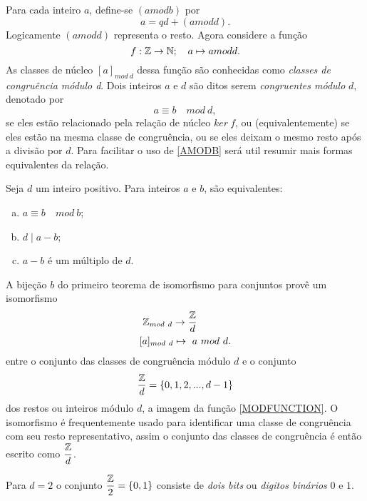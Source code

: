 Para cada inteiro $a$, define-se $(a mod b)$ por
\begin{equation}\label{MOD}
  a = qd + (a mod d).
\end{equation}
Logicamente $(a mod d)$ representa o resto. Agora considere a função
\begin{equation}\label{MODFUNCTION}
  f: \mathbb{Z} \to \mathbb{N};\quad a \mapsto a mod d.
\end{equation}
As classes de núcleo $[a]_{mod\ d}$ dessa função são conhecidas como \emph{classes de congruência módulo d}. Dois inteiros $a$ e $d$ são ditos serem \emph{congruentes módulo} $d$, denotado por
\begin{equation}\label{AMODB}
  a \equiv b\quad mod\ d,
\end{equation}
se eles estão relacionado pela relação de núcleo $ker\ f$, ou (equivalentemente) se eles estão na mesma classe de congruência, ou se eles deixam o mesmo resto após a divisão por $d$. Para facilitar o uso de \ref{AMODB} será util resumir mais formas equivalentes da relação.
\begin{stat}
  Seja $d$ um inteiro positivo. Para inteiros $a$ e $b$, são equivalentes:
  \begin{enumerate}[(a)]
    \item $a\equiv b\quad mod\ b$;
    \item $d \mid a - b$;
    \item $a-b$ é um múltiplo de $d$.
  \end{enumerate}
\end{stat}
A bijeção $b$ do primeiro teorema de isomorfismo para conjuntos provê um isomorfismo
\begin{alignat}{2}
  &\ \mathbb{Z}_{mod\ d} \to \dfrac{\mathbb{Z}}{d}\nonumber\\
  &[a]_{mod\ d} \mapsto\ a\ mod\ d.
  \nonumber
\end{alignat}
entre o conjunto das classes de congruência módulo $d$ e o conjunto $$\dfrac{\mathbb{Z}}{d} = \{0,1,2,... , d-1\}$$ dos restos ou inteiros módulo $d$, a imagem da função \ref{MODFUNCTION}. O isomorfismo é frequentemente usado para identificar uma classe de congruência com seu resto representativo, assim o conjunto das classes de congruência é então escrito como $\dfrac{\mathbb{Z}}{d}$.

Para $d=2$ o conjunto $\dfrac{\mathbb{Z}}{2} = \{0,1\}$ consiste de \emph{dois bits} ou \emph{digitos binários} $0$ e $1$.

